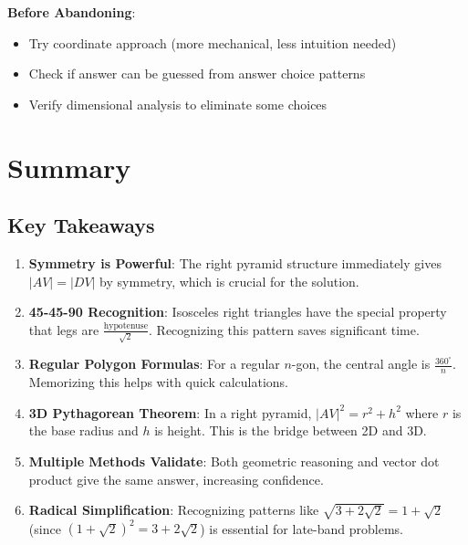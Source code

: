 \documentclass[12pt]{article}
\begin{document}
\begin{competitionbox}
\textbf{Before Abandoning}:
\begin{itemize}
    \item Try coordinate approach (more mechanical, less intuition needed)
    \item Check if answer can be guessed from answer choice patterns
    \item Verify dimensional analysis to eliminate some choices
\end{itemize}

\end{competitionbox}

\section*{Summary}

\subsection*{Key Takeaways}

\begin{enumerate}
    \item \textbf{Symmetry is Powerful}: The right pyramid structure immediately gives $|AV| = |DV|$ by symmetry, which is crucial for the solution.
    
    \item \textbf{45-45-90 Recognition}: Isosceles right triangles have the special property that legs are $\frac{\text{hypotenuse}}{\sqrt{2}}$. Recognizing this pattern saves significant time.
    
    \item \textbf{Regular Polygon Formulas}: For a regular $n$-gon, the central angle is $\frac{360^\circ}{n}$. Memorizing this helps with quick calculations.
    
    \item \textbf{3D Pythagorean Theorem}: In a right pyramid, $|AV|^2 = r^2 + h^2$ where $r$ is the base radius and $h$ is height. This is the bridge between 2D and 3D.
    
    \item \textbf{Multiple Methods Validate}: Both geometric reasoning and vector dot product give the same answer, increasing confidence.
    
    \item \textbf{Radical Simplification}: Recognizing patterns like $\sqrt{3+2\sqrt{2}} = 1 + \sqrt{2}$ (since $(1+\sqrt{2})^2 = 3 + 2\sqrt{2}$) is essential for late-band problems.
\end{enumerate}
\end{document}
